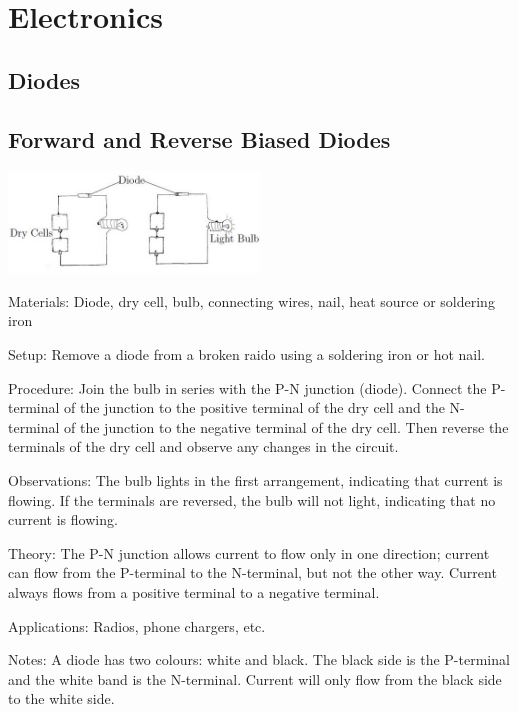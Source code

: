 \section{Electronics}

\begin{multicols}{2}


\section*{Diodes}


\subsection{Forward and Reverse Biased Diodes}

\begin{center}
\includegraphics[width=0.5\textwidth]{./img/diodes.jpg}
\end{center}

\begin{description*}
\item[Materials:]{Diode, dry cell, bulb, connecting wires, nail, heat source or soldering iron}
\item[Setup:]{Remove a diode from a broken raido using a soldering iron or hot nail.}
\item[Procedure:]{Join the bulb in series with the P-N junction (diode). Connect the P-terminal of the junction to the positive terminal of the dry cell and the N-terminal of the junction to the negative terminal of the dry cell. Then reverse the terminals of the dry cell and observe any changes in the circuit.}
\item[Observations:]{The bulb lights in the first arrangement, indicating that current is flowing. If the terminals are reversed, the bulb will not light, indicating that no current is flowing.}
\item[Theory:]{The P-N junction allows current to flow only in one direction; current can flow from the P-terminal to the N-terminal, but not the other way. Current always flows from a positive terminal to a negative terminal.}
\item[Applications:]{Radios, phone chargers, etc.}
\item[Notes:]{A diode has two colours: white and black. The black side is the P-terminal and the white band is the N-terminal. Current will only flow from the black side to the white side.}
\end{description*}


\end{multicols}
